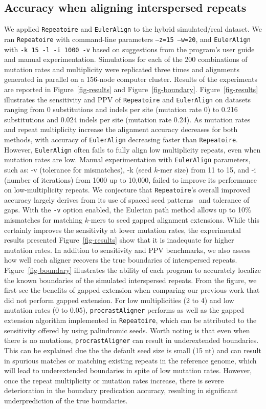 \documentclass[9.5pt,journal,final,finalsubmission,twocolumn]{IEEEtran}
\begin{document}
\subsection*{Accuracy when aligning interspersed repeats}
We applied \texttt{Repeatoire} and \texttt{EulerAlign} to the
hybrid simulated/real dataset.  We ran \texttt{Repeatoire}
with command-line parameters \texttt{--z=15 --w=20}, and
\texttt{EulerAlign} with \texttt{-k 15 -l -i 1000 -v} based on suggestions
from the program's user guide and manual experimentation.
Simulations for each of the 200 combinations of mutation rates and
multiplicity were replicated three times and alignments generated in
parallel on a 156-node computer cluster.   Results of the experiments
are reported in Figure~\ref{fig-results} and
Figure~\ref{fig-boundary}. Figure~\ref{fig-results} illustrates the
sensitivity and PPV of
\texttt{Repeatoire} and
\texttt{EulerAlign} on datasets ranging from 0 substitutions and
indels per site (mutation rate 0) to 0.216 substitutions and 0.024 indels per site (mutation rate 0.24).  As
mutation rates and repeat multiplicity increase the alignment accuracy
decreases for both methods, with accuracy of \texttt{EulerAlign}
decreasing faster than \texttt{Repeatoire}.  However, \texttt{EulerAlign}
often fails to fully align low multiplicity repeats, even when mutation rates are low.
Manual experimentation with \texttt{EulerAlign} parameters, such as: -v (tolerance for mismatches), -k (seed $k$-mer size) from 11 to 15, and -i (number of iterations) from 1000 up to 10,000, failed to improve its performance on low-multiplicity repeats.
We conjecture that \texttt{Repeatoire}'s overall improved accuracy largely derives
from its use of spaced seed patterns~\cite{ref-procrast} and tolerance
of gaps. With the \texttt{-v} option enabled, the Eulerian path method allows up to 10\% mismatches for matching $k$-mers to seed gapped alignment extensions. While this certainly improves the sensitivity at lower mutation rates, the experimental results presented Figure~\ref{fig-results} show that it is inadequate for higher mutation rates.
In addition to sensitivity and PPV benchmarks, we also assess how well
each aligner recovers the true boundaries of interspersed
repeats.  Figure~\ref{fig-boundary} illustrates the ability of each
program to accurately localize the known boundaries of the simulated interspersed
repeats. From the figure, we first see the benefits of gapped extension when comparing our previous work
that did not perform gapped extension. For low multiplicities (2 to 4) and low mutation rates (0 to 0.05), \texttt{procrastAligner} performs as well
as the gapped extension algorithm implemented in \texttt{Repeatoire}, which can be attributed to the sensitivity offered by using palindromic seeds. Worth noting is that even when there is no mutations, \texttt{procrastAligner} can result in underextended boundaries. This can be explained due the the default seed size is small (15 nt) and can result in spurious matches or matching existing repeats in the reference genome, which will lead to underextended boundaries in spite of low mutation rates. However, once the repeat multiplicity or mutation rates increase, there is severe deterioration in the boundary predication accuracy, resulting in significant underprediction of the true boundaries.
\end{document}

